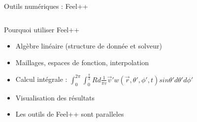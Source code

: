 \begin{frame}{Outils numériques : Feel++ }
\begin{columns}

        \begin{block}{}
          
        \end{block}
      \end{columns}


\end{frame}

\begin{frame}{Pourquoi utiliser Feel++}
\begin{itemize}
\item Algèbre linéaire (structure de donnée et solveur)
\item Maillages, espaces de fonction, interpolation
\item Calcul intégrale : %
$\int_{0}^{2\pi} \int_{0}^{\frac{\pi}{2}} Rd\frac{1}{\pi v} \vec{v}'w(\vec{r},\theta',\phi',t) sin \theta' d\theta' d\phi'$
\item Visualisation des résultats
\item Les outils de Feel++ sont paralleles
\end{itemize}

\end{frame}


